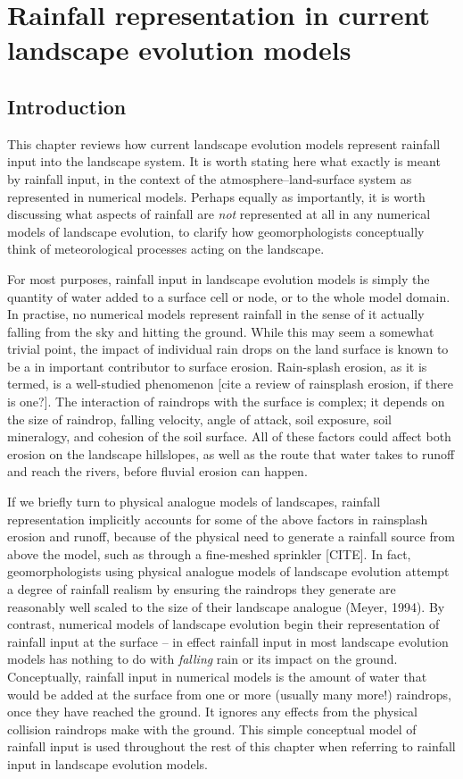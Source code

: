 \chapter{Rainfall representation in current landscape evolution models}
\label{RainfallInLEMs}

\section{Introduction}
This chapter reviews how current landscape evolution models represent rainfall input into the landscape system. It is worth stating here what exactly is meant by rainfall input, in the context of the atmosphere--land-surface system as represented in numerical models. Perhaps equally as importantly, it is worth discussing what aspects of rainfall are \textit{not} represented at all in any numerical models of landscape evolution, to clarify how geomorphologists conceptually think of meteorological processes acting on the landscape.

For most purposes, rainfall input in landscape evolution models is simply the quantity of water added to a surface cell or node, or to the whole model domain. In practise, no numerical models represent rainfall in the sense of it actually falling from the sky and hitting the ground. While this may seem a somewhat trivial point, the impact of individual rain drops on the land surface is known to be a in important contributor to surface erosion. Rain-splash erosion, as it is termed, is a well-studied phenomenon [cite a review of rainsplash erosion, if there is one?]. The interaction of raindrops with the surface is complex; it depends on the size of raindrop, falling velocity, angle of attack, soil exposure, soil mineralogy, and cohesion of the soil surface. All of these factors could affect both erosion on the landscape hillslopes, as well as the route that water takes to runoff and reach the rivers, before fluvial erosion can happen.

If we briefly turn to physical analogue models of landscapes, rainfall representation implicitly accounts for some of the above factors in rainsplash erosion and runoff, because of the physical need to generate a rainfall source from above the model, such as through a fine-meshed sprinkler [CITE]. In fact, geomorphologists using physical analogue models of landscape evolution attempt a degree of rainfall realism by ensuring the raindrops they generate are reasonably well scaled to the size of their landscape analogue (Meyer, 1994). By contrast, numerical models of landscape evolution begin their representation of rainfall input at the surface -- in effect rainfall input in most landscape evolution models has nothing to do with \textit{falling} rain or its impact on the ground. Conceptually, rainfall input in numerical models is the amount of water that would be added at the surface from one or more (usually many more!) raindrops, once they have reached the ground. It ignores any effects from the physical collision raindrops make with the ground. This simple conceptual model of rainfall input is used throughout the rest of this chapter when referring to rainfall input in landscape evolution models.

